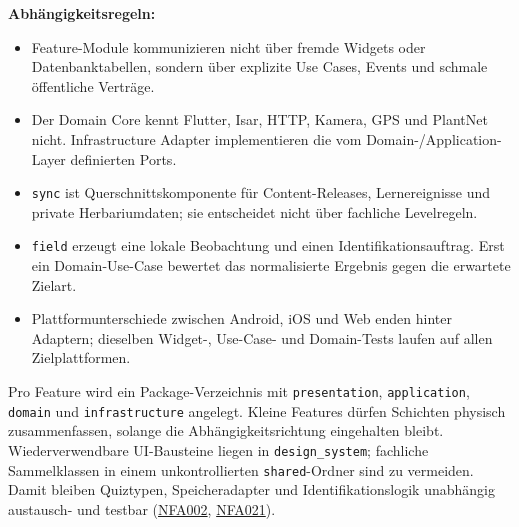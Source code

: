 \documentclass[10pt,a4paper,oneside]{article}
\newcommand{\R}[1]{\hyperlink{req:#1}{\textcolor{Forest}{#1}}}
\newcommand{\Code}[1]{\texttt{\small #1}}
\begin{document}
\begin{center}
{}
\end{center}

\textbf{Abhängigkeitsregeln:}
\begin{itemize}
  \item Feature-Module kommunizieren nicht über fremde Widgets oder Datenbanktabellen, sondern über explizite Use Cases, Events und schmale öffentliche Verträge.
  \item Der Domain Core kennt Flutter, Isar, HTTP, Kamera, GPS und PlantNet nicht. Infrastructure Adapter implementieren die vom Domain-/Application-Layer definierten Ports.
  \item \Code{sync} ist Querschnittskomponente für Content-Releases, Lernereignisse und private Herbariumdaten; sie entscheidet nicht über fachliche Levelregeln.
  \item \Code{field} erzeugt eine lokale Beobachtung und einen Identifikationsauftrag. Erst ein Domain-Use-Case bewertet das normalisierte Ergebnis gegen die erwartete Zielart.
  \item Plattformunterschiede zwischen Android, iOS und Web enden hinter Adaptern; dieselben Widget-, Use-Case- und Domain-Tests laufen auf allen Zielplattformen.
\end{itemize}

\begin{decisionbox}[title={\textbf{Konkreter Modulzuschnitt für das MVP}}]
Pro Feature wird ein Package-Verzeichnis mit \Code{presentation}, \Code{application}, \Code{domain} und \Code{infrastructure} angelegt. Kleine Features dürfen Schichten physisch zusammenfassen, solange die Abhängigkeitsrichtung eingehalten bleibt. Wiederverwendbare UI-Bausteine liegen in \Code{design\_system}; fachliche Sammelklassen in einem unkontrollierten \Code{shared}-Ordner sind zu vermeiden. Damit bleiben Quiztypen, Speicheradapter und Identifikationslogik unabhängig austausch- und testbar (\R{NFA002}, \R{NFA021}).
\end{decisionbox}
\end{document}
